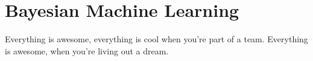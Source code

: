 \chapter{Bayesian Machine Learning}
\label{toc:bayesian_ml}
Everything is awesome, everything is cool when you're part of a team.
Everything is awesome, when you're living out a dream.
